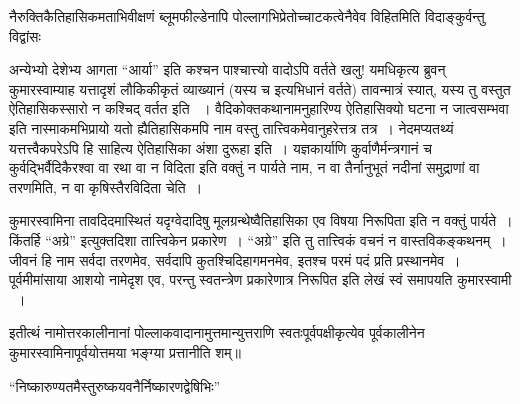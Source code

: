 नैरुक्तिकैतिहासिकमताभिवीक्षणं ब्लूमफील्डेनापि पोल्लागभिप्रेतोच्चाटकत्वेनैवेव विहितमिति विदाङ्कुर्वन्तु विद्वांसः 


अन्येभ्यो देशेभ्य आगता “आर्या” इति कश्चन पाश्चात्त्यो वादोऽपि वर्तते खलु! यमधिकृत्य ब्रुवन् कुमारस्वाम्याह यत्तादृशं लौकिकीकृतं व्याख्यानं (यस्य च  इत्यभिधानं वर्तते) तावन्मात्रं स्यात्, यस्य तु वस्तुत ऐतिहासिकस्सारो न कश्चिद् वर्तत इति ~। वैदिकोक्तकथानामनुहारिण्य ऐतिहासिक्यो घटना न जात्वसम्भवा इति नास्माकमभिप्रायो यतो ह्यैतिहासिकमपि नाम वस्तु तात्त्विकमेवानुहरेत्तत्र तत्र~। नेदमप्यतथ्यं यत्तत्त्वैकपरेऽपि हि साहित्य ऐतिहासिका अंशा दुरूहा इति~। यज्ञकार्याणि कुर्वाणैर्मन्त्रगानं च कुर्वद्भिर्वैदिकैरश्वा वा रथा वा न विदिता इति वक्तुं न पार्यते नाम, न वा तैर्नानुभूतं नदीनां समुद्राणां वा तरणमिति, न वा कृषिस्तैरविदिता चेति~।

\newpage

कुमारस्वामिना तावदिदमास्थितं यदृग्वेदादिषु मूलग्रन्थेष्वैतिहासिका एव विषया निरूपिता इति न वक्तुं पार्यते~। किंतर्हि “अग्रे” इत्युक्तदिशा तात्त्विकेन प्रकारेण~। “अग्रे” इति तु तात्त्विकं वचनं न वास्तविकङ्कथनम्~। जीवनं हि नाम सर्वदा तरणमेव, सर्वदापि कुतश्चिदिहागमनमेव, इतश्च परमं पदं प्रति प्रस्थानमेव~। पूर्वमीमांसाया आशयो नामेदृश एव, परन्तु स्वतन्त्रेण प्रकारेणात्र निरूपित इति लेखं स्वं समापयति कुमारस्वामी ~।

इतीत्थं नामोत्तरकालीनानां पोल्लाकवादानामुत्तमान्युत्तराणि स्वतःपूर्वपक्षीकृत्येव पूर्वकालीनेन कुमारस्वामिनापूर्वयोत्तमया भङ्ग्या प्रत्तानीति शम्॥

\begin{center}
“निष्कारुण्यतमैस्तुरुष्कयवनैर्निष्कारणद्वेषिभिः”
\end{center}
\egroup

